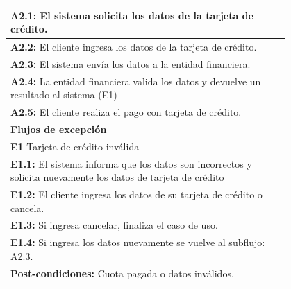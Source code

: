 \documentclass[12pt,a4paper,titlepage,oneside]{article}
\begin{document}
\begin{tabular}{| l | p{0.8\linewidth} |}
	\multicolumn{2}{|p{0.8\linewidth}|}{\textbf{A2.1:} El sistema solicita los datos de la tarjeta de crédito.} \\ \hline
	\multicolumn{2}{|p{0.8\linewidth}|}{\textbf{A2.2:} El cliente ingresa los datos de la tarjeta de crédito.} \\ \hline
	\multicolumn{2}{|p{0.8\linewidth}|}{\textbf{A2.3:} El sistema envía los datos a la entidad financiera.} \\ \hline
	\multicolumn{2}{|p{0.8\linewidth}|}{\textbf{A2.4:} La entidad financiera valida los datos y devuelve un resultado al sistema (E1)} \\ \hline
	\multicolumn{2}{|p{0.8\linewidth}|}{\textbf{A2.5:} El cliente realiza el pago con tarjeta de crédito.} \\ \hline
	\multicolumn{2}{|p{0.8\linewidth}|}{\textbf{Flujos de excepci\'on}} \\ \hline
	\multicolumn{2}{|p{0.8\linewidth}|}{\textbf{E1} Tarjeta de crédito inválida} \\ \hline
	\multicolumn{2}{|p{0.8\linewidth}|}{\textbf{E1.1:} El sistema informa que los datos son incorrectos y solicita nuevamente los datos de tarjeta de crédito} \\ \hline
	\multicolumn{2}{|p{0.8\linewidth}|}{\textbf{E1.2:} El cliente ingresa los datos de su tarjeta de crédito o cancela.} \\ \hline
	\multicolumn{2}{|p{0.8\linewidth}|}{\textbf{E1.3:} Si ingresa cancelar, finaliza el caso de uso.} \\ \hline
	\multicolumn{2}{|p{0.8\linewidth}|}{\textbf{E1.4:} Si ingresa los datos nuevamente se vuelve al subflujo: A2.3.} \\ \hline
	\multicolumn{2}{|p{0.8\linewidth}|}{\textbf{Post-condiciones:} Cuota pagada o datos inválidos.}\\ \hline
\end{tabular} \\\\
 \\\\
 
\end{document}
